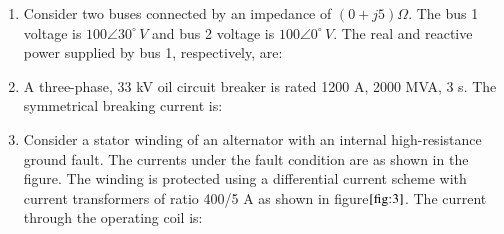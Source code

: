 \documentclass[journal]{IEEEtran}
\numberwithin{equation}{enumi}
\numberwithin{figure}{enumi}
\begin{document}
\begin{enumerate}
    \item Consider two buses connected by an impedance of $(0 + j5) \Omega$. The bus 1 voltage is $100 \angle 30^\circ \, V$ and bus 2 voltage is $100 \angle 0^\circ \, V$. The real and reactive power supplied by bus 1, respectively, are:
    \begin{enumerate}
    \end{enumerate}

    \item A three-phase, 33 kV oil circuit breaker is rated 1200 A, 2000 MVA, 3 s. The symmetrical breaking current is:
    \begin{enumerate}
    \end{enumerate}

    \item Consider a stator winding of an alternator with an internal high-resistance ground fault. The currents under the fault condition are as shown in the figure. The winding is protected using a differential current scheme with current transformers of ratio 400/5 A as shown in figure$\ref{fig:3}$. The current through the operating coil is:
    \begin{figure}[!ht]
			\centering
\end{figure}
\end{enumerate}
\end{document}
